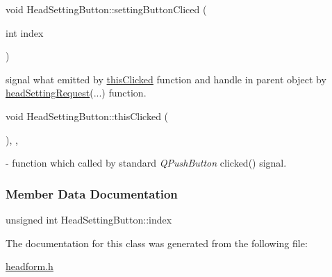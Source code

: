 \mbox{\label{classHeadSettingButton_acd459234032c48f57a7a964c214ca0bf}} 
{\footnotesize\ttfamily void Head\+Setting\+Button\+::\texorpdfstring{setting\+Button\+Cliced}{settingButtonCliced} (\begin{DoxyParamCaption}\item[{int}]{index }\end{DoxyParamCaption}){\ttfamily [signal]}} signal what emitted by \hyperlink{classHeadSettingButton_a9b462518ae3b222488fbec936c39c294}{this\+Clicked} function and handle in parent object by \hyperlink{classMainWindow_ae823008e53cce4636c1776d86c946cf5}{head\+Setting\+Request}(...) function. 

\mbox{\label{classHeadSettingButton_a9b462518ae3b222488fbec936c39c294}} 
{\footnotesize\ttfamily void Head\+Setting\+Button\+::\texorpdfstring{this\+Clicked}{thisClicked} (\begin{DoxyParamCaption}{ }\end{DoxyParamCaption}){\ttfamily [inline]}, {\ttfamily [private]}, {\ttfamily [slot]}} - function which called by standard \textit{Q\+Push\+Button} clicked() signal. 

\subsubsection{Member Data Documentation}
\mbox{\label{classHeadSettingButton_ad583fdc744e019c787477694427cdde0}} 
{\footnotesize\ttfamily unsigned int Head\+Setting\+Button\+::\texorpdfstring{index}{index}{\ttfamily [private]}}

The documentation for this class was generated from the following file\+:\begin{DoxyCompactItemize}
\item 
\mbox{\hyperlink{headform_8h}{headform.\+h}}\end{DoxyCompactItemize}
\newpage